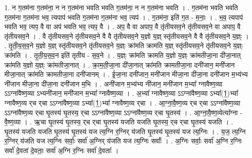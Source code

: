 \documentclass[17pt]{extarticle}
\begin{document}
1. न ग॒तम॑ना ग॒तम॑ना॒ न न ग॒तम॑ना भवति भवति ग॒तम॑ना॒ न न ग॒तम॑ना भवति । . ग॒तम॑ना भवति भवति ग॒तम॑ना ग॒तम॑ना भव॒ त्यपाप॑ भवति ग॒तम॑ना ग॒तम॑ना भव॒ त्यप॑ । . ग॒तम॑ना॒ इति॑ ग॒त - म॒नाः॒ । . भ॒व॒ त्यपाप॑ भवति भव॒ त्यप॒ वै वा अप॑ भवति भव॒ त्यप॒ वै । . अप॒ वै वा अपाप॒ वै तृ॑तीयसव॒ने तृ॑तीयसव॒ने वा अपाप॒ वै तृ॑तीयसव॒ने । . वै तृ॑तीयसव॒ने तृ॑तीयसव॒ने वै वै तृ॑तीयसव॒ने य॒ज्ञो य॒ज्ञ् स्तृ॑तीयसव॒ने वै वै तृ॑तीयसव॒ने य॒ज्ञ्ः । . तृ॒ती॒य॒स॒व॒ने य॒ज्ञो य॒ज्ञ् स्तृ॑तीयसव॒ने तृ॑तीयसव॒ने य॒ज्ञ्ः क्रा॑मति क्रामति य॒ज्ञ् स्तृ॑तीयसव॒ने तृ॑तीयसव॒ने य॒ज्ञ्ः क्रा॑मति । . तृ॒ती॒य॒स॒व॒न इति॑ तृतीय - स॒व॒ने । . य॒ज्ञ्ः क्रा॑मति क्रामति य॒ज्ञो य॒ज्ञ्ः क्रा॑मतीजा॒ना दी॑जा॒नात् क्रा॑मति य॒ज्ञो य॒ज्ञ्ः क्रा॑मतीजा॒नात् । . क्रा॒म॒ती॒जा॒ना दी॑जा॒नात् क्रा॑मति क्रामतीजा॒ना दनी॑जान॒ मनी॑जान मीजा॒नात् क्रा॑मति क्रामतीजा॒ना दनी॑जानम् । . ई॒जा॒ना दनी॑जान॒ मनी॑जान मीजा॒ना दी॑जा॒ना दनी॑जान म॒भ्य॑भ्य नी॑जान मीजा॒ना दी॑जा॒ना दनी॑जान म॒भि । . अनी॑जान म॒भ्य॑भ्य नी॑जान॒ मनी॑जान म॒भ्या᳚ ग्नावैष्ण॒व्या ऽऽग्ना॑वैष्ण॒व्या ऽभ्यनी॑जान॒ मनी॑जान म॒भ्या᳚ ग्नावैष्ण॒व्या । . अ॒भ्या᳚ ग्नावैष्ण॒व्या ऽऽग्ना॑वैष्ण॒व्या ऽभ्या᳚(1॒)भ्या᳚ ग्नावैष्ण॒व्य र्‌च र्‌चा ऽऽग्ना॑वैष्ण॒व्या ऽभ्या᳚(1॒)भ्या᳚ ग्नावैष्ण॒व्य र्‌चा । . आ॒ग्ना॒वै॒ष्ण॒व्य र्‌च र्‌चा ऽऽग्ना॑वैष्ण॒व्या ऽऽग्ना॑वैष्ण॒व्य र्‌चा घृ॒तस्य॑ घृ॒तस्य॒ र्‌चा ऽऽग्ना॑वैष्ण॒व्या ऽऽग्ना॑वैष्ण॒व्य र्‌चा घृ॒तस्य॑ । . आ॒ग्ना॒वै॒ष्ण॒व्येत्या᳚ग्ना - वै॒ष्ण॒व्या । . ऋ॒चा घृ॒तस्य॑ घृ॒तस्य॒ र्‌च र्‌चा घृ॒तस्य॑ यजति यजति घृ॒तस्य॒ र्‌च र्‌चा घृ॒तस्य॑ यजति । . घृ॒तस्य॑ यजति यजति घृ॒तस्य॑ घृ॒तस्य॑ यज त्य॒ग्नि र॒ग्निर् य॑जति घृ॒तस्य॑ घृ॒तस्य॑ यज त्य॒ग्निः । . य॒ज॒ त्य॒ग्नि र॒ग्निर् य॑जति यज त्य॒ग्निः सर्वाः॒ सर्वा॑ अ॒ग्निर् य॑जति यज त्य॒ग्निः सर्वाः᳚ । . अ॒ग्निः सर्वाः॒ सर्वा॑ अ॒ग्नि र॒ग्निः सर्वा॑ दे॒वता॑ दे॒वताः॒ सर्वा॑ अ॒ग्नि र॒ग्निः सर्वा॑ दे॒वताः᳚ । \newline
\end{document}

